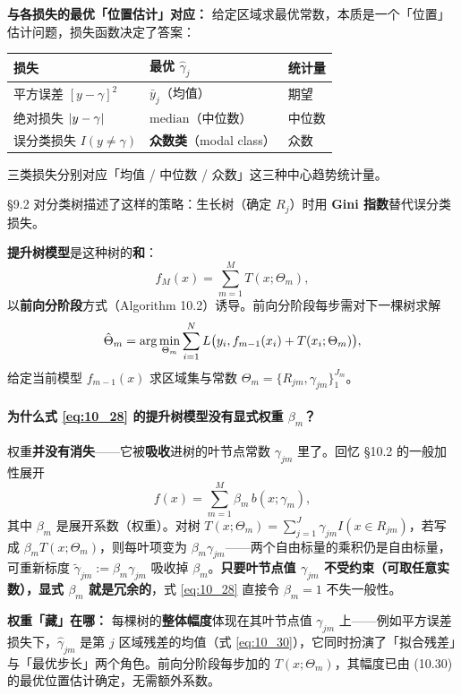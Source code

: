 \textbf{与各损失的最优「位置估计」对应：} 给定区域求最优常数，本质是一个「位置」估计问题，损失函数决定了答案：
\begin{center}
\begin{tabular}{lll}
\toprule
\textbf{损失} & \textbf{最优 $\hat\gamma_j$} & \textbf{统计量} \\
\midrule
平方误差 $[y-\gamma]^2$ & $\bar y_j$（均值） & 期望 \\
绝对损失 $\left\lvert y-\gamma\right\rvert$ & $\mathrm{median}$（中位数） & 中位数 \\
误分类损失 $I(y\neq\gamma)$ & \textbf{众数类}（modal class） & 众数 \\
\bottomrule
\end{tabular}
\end{center}
三类损失分别对应「均值 / 中位数 / 众数」这三种中心趋势统计量。

§9.2 对分类树描述了这样的策略：生长树（确定 $R_j$）时用 \textbf{Gini 指数}替代误分类损失。

\textbf{提升树模型}是这种树的\textbf{和}：
\begin{equation}\label{eq:10_28}
    f_M(x) = \sum_{m=1}^{M} T(x; \Theta_m),
\end{equation}
以\textbf{前向分阶段}方式（Algorithm 10.2）诱导。前向分阶段每步需对下一棵树求解
\begin{equation}\label{eq:10_29}
    \hat\Theta_m = \arg\min_{\Theta_m} \sum_{i=1}^{N} L\bigl(y_i, f_{m-1}(x_i) + T(x_i; \Theta_m)\bigr),
\end{equation}
给定当前模型 $f_{m-1}(x)$ 求区域集与常数 $\Theta_m = \{R_{jm}, \gamma_{jm}\}_1^{J_m}$。

\paragraph{为什么式 \eqref{eq:10_28} 的提升树模型没有显式权重 $\beta_m$？}

权重\textbf{并没有消失}——它被\textbf{吸收}进树的叶节点常数 $\gamma_{jm}$ 里了。回忆 §10.2 的一般加性展开
\[
    f(x) = \sum_{m=1}^{M} \beta_m\, b(x; \gamma_m),
\]
其中 $\beta_m$ 是展开系数（权重）。对树 $T(x;\Theta_m) = \sum_{j=1}^{J} \gamma_{jm} I(x \in R_{jm})$，若写成 $\beta_m T(x;\Theta_m)$，则每叶项变为 $\beta_m \gamma_{jm}$——两个自由标量的乘积仍是自由标量，可重新标度 $\tilde\gamma_{jm} := \beta_m \gamma_{jm}$ 吸收掉 $\beta_m$。\textbf{只要叶节点值 $\gamma_{jm}$ 不受约束（可取任意实数），显式 $\beta_m$ 就是冗余的}，式 \eqref{eq:10_28} 直接令 $\beta_m = 1$ 不失一般性。

\textbf{权重「藏」在哪：} 每棵树的\textbf{整体幅度}体现在其叶节点值 $\gamma_{jm}$ 上——例如平方误差损失下，$\hat\gamma_{jm}$ 是第 $j$ 区域残差的均值（式 \eqref{eq:10_30}），它同时扮演了「拟合残差」与「最优步长」两个角色。前向分阶段每步加的 $T(x;\Theta_m)$，其幅度已由 (10.30) 的最优位置估计确定，无需额外系数。

